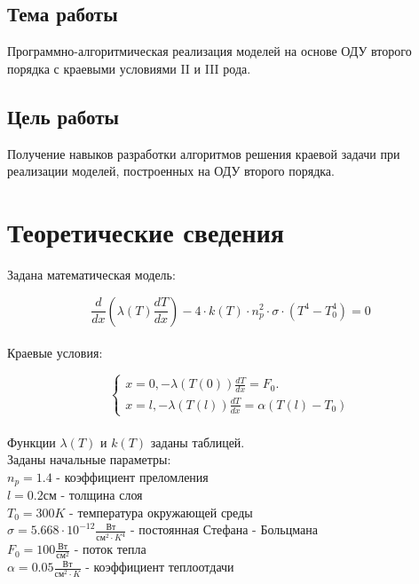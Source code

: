 \section*{Тема работы}

Программно-алгоритмическая реализация моделей на основе ОДУ второго порядка с краевыми условиями II и III рода.

\section*{Цель работы}

Получение навыков разработки алгоритмов решения краевой задачи при реализации моделей, построенных на ОДУ второго порядка.

\chapter{Теоретические сведения}

Задана математическая модель:

\begin{equation*}
	\frac{d}{dx}(\lambda(T)\frac{dT}{dx}) - 4 \cdot k(T) \cdot n_{p}^2 \cdot \sigma \cdot (T^4 - T_{0}^4) = 0
\end{equation*}\\

Краевые условия:

\begin{equation*}
	\begin{cases} x = 0, -\lambda(T(0))\frac{dT}{dx} = F_{0}.
	\\ x = l, -\lambda(T(l))\frac{dT}{dx} = \alpha(T(l) - T_{0})
	\end{cases}
\end{equation*}\\

Функции $\lambda(T)$ и $k(T)$ заданы таблицей.\\

Заданы начальные параметры:\\
\indent $n_p = 1.4$ - коэффициент преломления\\
\indent $l = 0.2 \text{см}$ - толщина слоя\\
\indent $T_{0} = 300K$ - температура окружающей среды\\
\indent $\sigma = 5.668 \cdot 10^{-12} \frac{\text{Вт}}{\text{см}^2 \cdot K^4}$ - постоянная Стефана - Больцмана\\
\indent $F_{0} = 100 \frac{\text{Вт}}{\text{см}^2}$ - поток тепла\\
\indent $\alpha = 0.05 \frac{\text{Вт}}{\text{см}^2 \cdot K}$ - коэффициент теплоотдачи\\


